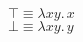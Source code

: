 \documentclass[12pt,letterpaper,boxed]{hmcpset}
\begin{document}
%
%
%
%
%
%
%
%
%
%
%
%
%
%
\noindent
$\top \equiv \lambda xy. \, x$ \\
$\bot \equiv \lambda xy. \, y$ \\
\end{document}
